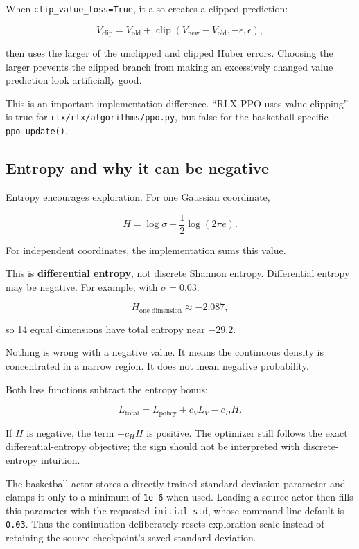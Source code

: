 \documentclass[
  american,
  11pt,
  letterpaper,
]{article}
\begin{document}
When \texttt{clip\_value\_loss=True}, it also creates a clipped
prediction:

\[
V_{\mathrm{clip}}
=
V_{\mathrm{old}}+
\operatorname{clip}(V_{\mathrm{new}}-V_{\mathrm{old}},-\epsilon,\epsilon),
\]

then uses the larger of the unclipped and clipped Huber errors. Choosing
the larger prevents the clipped branch from making an excessively
changed value prediction look artificially good.

This is an important implementation difference. ``RLX PPO uses value
clipping'' is true for
\texttt{rlx/\allowbreak{}rlx/\allowbreak{}algorith\allowbreak{}ms/\allowbreak{}ppo.py},
but false for the basketball-specific \texttt{ppo\_update()}.

\subsection{Entropy and why it can be
negative}\label{entropy-and-why-it-can-be-negative}

Entropy encourages exploration. For one Gaussian coordinate,

\[
H
=
\log\sigma+\frac12\log(2\pi e).
\]

For independent coordinates, the implementation sums this value.

This is \textbf{differential entropy}, not discrete Shannon entropy.
Differential entropy may be negative. For example, with \(\sigma=0.03\):

\[
H_{\text{one dimension}}\approx-2.087,
\]

so 14 equal dimensions have total entropy near \(-29.2\).

Nothing is wrong with a negative value. It means the continuous density
is concentrated in a narrow region. It does not mean negative
probability.

Both loss functions subtract the entropy bonus:

\[
L_{\mathrm{total}}
=
L_{\mathrm{policy}}
+c_VL_V
-c_HH.
\]

If \(H\) is negative, the term \(-c_HH\) is positive. The optimizer
still follows the exact differential-entropy objective; the sign should
not be interpreted with discrete-entropy intuition.

The basketball actor stores a directly trained standard-deviation
parameter and clamps it only to a minimum of \texttt{1e-6} when used.
Loading a source actor then fills this parameter with the requested
\texttt{initial\_std}, whose command-line default is \texttt{0.03}. Thus
the continuation deliberately resets exploration scale instead of
retaining the source checkpoint's saved standard deviation.
\end{document}

